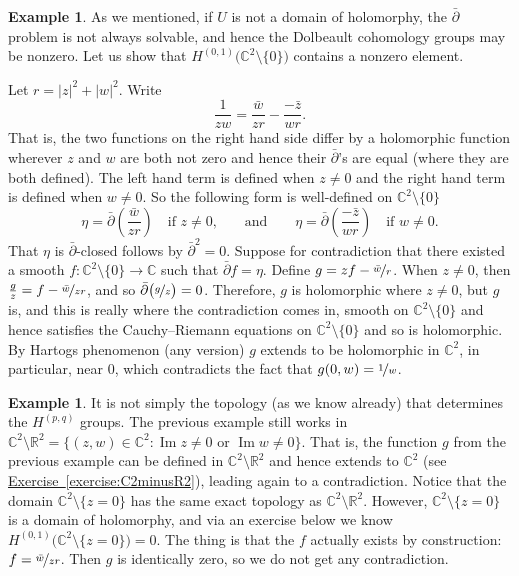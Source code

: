 \documentclass[12pt,openany]{book}
\renewcommand{\Im}{\operatorname{Im}}
\newcommand{\sabs}[1]{\lvert {#1} \rvert}
\newcommand{\C}{{\mathbb{C}}}
\newcommand{\R}{{\mathbb{R}}}
\theoremstyle{plain}
\theoremstyle{remark}
\theoremstyle{definition}
\theoremstyle{exercise}
\theoremstyle{example}
\newtheorem{example}[thm]{Example}
\newcommand{\exerciseref}[1]{\hyperref[#1]{Exercise~\ref*{#1}}}
\begin{document}
\begin{example}
As we mentioned, if $U$ is not a domain of holomorphy, the $\bar{\partial}$
problem is not always solvable, and hence the Dolbeault cohomology groups
may be nonzero.  Let us show that
$H^{(0,1)}\bigl(\C^2 \setminus \{ 0 \}\bigr)$ contains a nonzero element.

Let $r = \sabs{z}^2+\sabs{w}^2$.  Write
\begin{equation*}
\frac{1}{zw} = \frac{\bar{w}}{z r} - \frac{-\bar{z}}{w r} .
\end{equation*}
That is, the two functions on the right hand side differ by a holomorphic
function wherever $z$ and $w$ are both not zero and hence their
$\bar{\partial}$'s are equal (where they are both defined).  The left hand
term is defined when $z\not=0$ and the right hand term is defined when $w
\not=0$.  So the following form is well-defined on $\C^2 \setminus \{ 0 \}$
\begin{equation*}
\eta =
\bar{\partial}
\left(
\dfrac{\bar{w}}{z r}
\right)
\quad \text{if $z\not=0$,}
\qquad \text{and} \qquad
\eta =
\bar{\partial}
\left(
\dfrac{-\bar{z}}{w r}
\right)
\quad \text{if $w\not=0$} .
\end{equation*}
That $\eta$ is $\bar{\partial}$-closed follows by $\bar{\partial}^2 = 0$.
Suppose for contradiction that there existed a smooth
$f \colon \C^2 \setminus \{ 0 \} \to \C$
such that $\bar{\partial} f = \eta$.
Define $g = z f - \nicefrac{\bar{w}}{r}$.  When $z\not=0$, then
$\frac{g}{z} = f - \nicefrac{\bar{w}}{zr}$, and so
$\bar{\partial}\bigl(\nicefrac{g}{z}\bigr) = 0$.  Therefore, $g$ is holomorphic
where $z\not=0$, but $g$ is, and this is really where the contradiction
comes in, smooth on $\C^2 \setminus \{ 0 \}$ and hence satisfies the
Cauchy--Riemann equations on $\C^2 \setminus \{ 0 \}$ and so is holomorphic.
By Hartogs phenomenon (any version) $g$ extends to be holomorphic in $\C^2$,
in particular, near $0$, which contradicts the fact that $g(0,w) =
\nicefrac{1}{w}$.
\end{example}

\begin{example}
It is not simply the topology (as we know already) that determines the
$H^{(p,q)}$ groups.  The previous example still works in $\C^2 \setminus
\R^2 = \bigl\{ (z,w) \in \C^2 :
\Im z \not= 0 \text{ or } \Im w \not= 0 \bigr\}$.
That is, the function $g$ from the previous example can be defined in
$\C^2 \setminus \R^2$ and hence extends to $\C^2$
(see \exerciseref{exercise:C2minusR2}),
leading again to a contradiction.
Notice that the domain
$\C^2 \setminus \{ z = 0\}$
has the same exact topology as $\C^2 \setminus \R^2$.
However,
$\C^2 \setminus \{ z = 0\}$
is a domain of holomorphy, and via an exercise below we know
$H^{(0,1)}\bigl(\C^2 \setminus \{ z = 0\}\bigr) = 0$.
The thing is that the $f$ actually exists
by construction: $f = \nicefrac{\bar{w}}{z r}$.  Then $g$ is identically
zero, so we do not get any contradiction.
\end{example}
\end{document}
